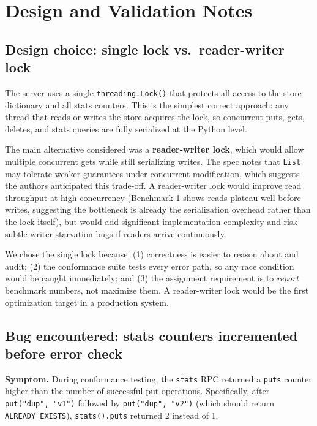 \documentclass[11pt,letterpaper]{article}
\begin{document}
\section{Design and Validation Notes}

\subsection{Design choice: single lock vs.\ reader-writer lock}

The server uses a single \texttt{threading.Lock()} that protects all access to
the store dictionary and all stats counters.
This is the simplest correct approach: any thread that reads or writes the
store acquires the lock, so concurrent puts, gets, deletes, and stats queries
are fully serialized at the Python level.

The main alternative considered was a \textbf{reader-writer lock}, which would
allow multiple concurrent gets while still serializing writes.
The spec notes that \texttt{List} may tolerate weaker guarantees under
concurrent modification, which suggests the authors anticipated this
trade-off.
A reader-writer lock would improve read throughput at high concurrency
(Benchmark 1 shows reads plateau well before writes, suggesting the bottleneck
is already the serialization overhead rather than the lock itself), but would
add significant implementation complexity and risk subtle writer-starvation
bugs if readers arrive continuously.

We chose the single lock because: (1) correctness is easier to reason about
and audit; (2) the conformance suite tests every error path, so any race
condition would be caught immediately; and (3) the assignment requirement is
to \emph{report} benchmark numbers, not maximize them.
A reader-writer lock would be the first optimization target in a production
system.

\subsection{Bug encountered: stats counters incremented before error check}

\textbf{Symptom.}
During conformance testing, the \texttt{stats} RPC returned a \texttt{puts}
counter higher than the number of successful put operations.
Specifically, after \texttt{put("dup", "v1")} followed by
\texttt{put("dup", "v2")} (which should return \texttt{ALREADY\_EXISTS}),
\texttt{stats().puts} returned 2 instead of 1.
\end{document}
